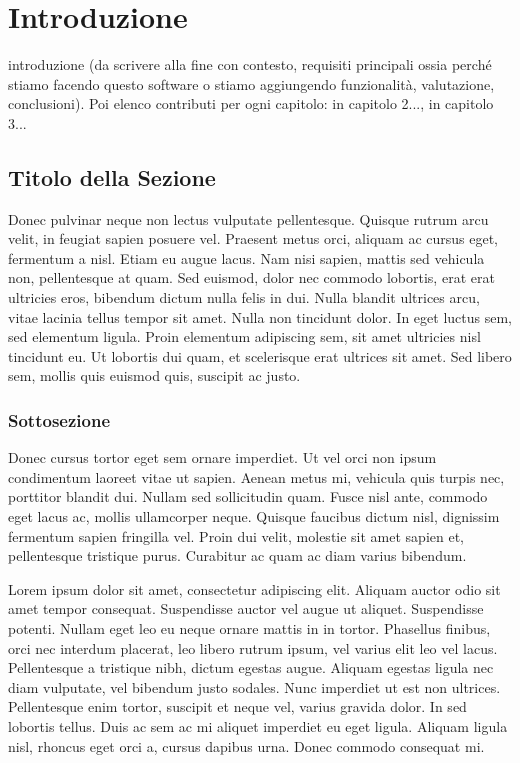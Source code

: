 \documentclass[target=bach,aauheader=,style=]{thud}
\begin{document}
\chapter{Introduzione}

introduzione (da scrivere alla fine con contesto, requisiti principali ossia perché stiamo facendo questo software o
stiamo aggiungendo funzionalità, valutazione, conclusioni). Poi elenco contributi per ogni capitolo:
in capitolo 2..., in capitolo 3...

\section{Titolo della Sezione}
Donec pulvinar neque non lectus vulputate pellentesque. Quisque rutrum arcu velit, in feugiat sapien posuere vel. Praesent metus orci, aliquam ac cursus eget, fermentum a nisl. Etiam eu augue lacus. Nam nisi sapien, mattis sed vehicula non, pellentesque at quam. Sed euismod, dolor nec commodo lobortis, erat erat ultricies eros, bibendum dictum nulla felis in dui. Nulla blandit ultrices arcu, vitae lacinia tellus tempor sit amet. Nulla non tincidunt dolor. In eget luctus sem, sed elementum ligula. Proin elementum adipiscing sem, sit amet ultricies nisl tincidunt eu. Ut lobortis dui quam, et scelerisque erat ultrices sit amet. Sed libero sem, mollis quis euismod quis, suscipit ac justo.

\subsection{Sottosezione}
Donec cursus tortor eget sem ornare imperdiet. Ut vel orci non ipsum condimentum laoreet vitae ut sapien. Aenean metus mi, vehicula quis turpis nec, porttitor blandit dui. Nullam sed sollicitudin quam. Fusce nisl ante, commodo eget lacus ac, mollis ullamcorper neque. Quisque faucibus dictum nisl, dignissim fermentum sapien fringilla vel. Proin dui velit, molestie sit amet sapien et, pellentesque tristique purus. Curabitur ac quam ac diam varius bibendum.

Lorem ipsum dolor sit amet, consectetur adipiscing elit. Aliquam auctor odio sit amet tempor consequat. Suspendisse auctor vel augue ut aliquet. Suspendisse potenti. Nullam eget leo eu neque ornare mattis in in tortor. Phasellus finibus, orci nec interdum placerat, leo libero rutrum ipsum, vel varius elit leo vel lacus. Pellentesque a tristique nibh, dictum egestas augue. Aliquam egestas ligula nec diam vulputate, vel bibendum justo sodales. Nunc imperdiet ut est non ultrices. Pellentesque enim tortor, suscipit et neque vel, varius gravida dolor. In sed lobortis tellus. Duis ac sem ac mi aliquet imperdiet eu eget ligula. Aliquam ligula nisl, rhoncus eget orci a, cursus dapibus urna. Donec commodo consequat mi.
\end{document}
